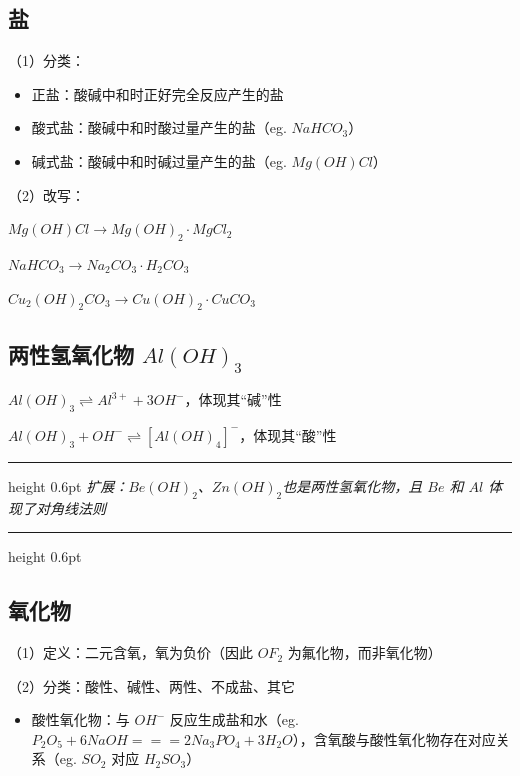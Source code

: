 \documentclass[UTF8,zihao=-4,openany]{ctexbook}
\newenvironment{notebox}
  {\par\smallskip\noindent\begingroup\begin{minipage}{\linewidth}\color{noteframe}\hrule height 0.6pt\smallskip\color{black}\itshape}
  {\par\smallskip\color{noteframe}\hrule height 0.6pt\end{minipage}\endgroup\par\smallskip}
\begin{document}
\subsection{盐}
（1）分类：\par
\begin{itemize}
\item 正盐：酸碱中和时正好完全反应产生的盐
\end{itemize}

\begin{itemize}
\item 酸式盐：酸碱中和时酸过量产生的盐（eg. $NaHCO_3$）
\item 碱式盐：酸碱中和时碱过量产生的盐（eg. $Mg(OH)Cl$）
\end{itemize}

（2）改写：\par

$Mg(OH)Cl \to Mg(OH)_2\cdot MgCl_2$\par

$NaHCO_3 \to Na_2CO_3\cdot H_2CO_3$\par

$Cu_2(OH)_2CO_3 \to Cu(OH)_2\cdot CuCO_3$\par
\subsection{两性氢氧化物 $Al(OH)_3$}
$Al(OH)_3\rightleftharpoons Al^{3+}+3OH^-$，体现其“碱”性\par

$Al(OH)_3+OH^-\rightleftharpoons [Al(OH)_4]^-$，体现其“酸”性\par
\begin{notebox}
扩展：$Be(OH)_2$、$Zn(OH)_2$也是两性氢氧化物，且 $Be$ 和 $Al$ 体现了对角线法则\par
\end{notebox}
\subsection{氧化物}
（1）定义：二元含氧，氧为负价（因此 $OF_2$ 为氟化物，而非氧化物）\par

（2）分类：酸性、碱性、两性、不成盐、其它\par

\begin{itemize}
\item 酸性氧化物：与 $OH^-$ 反应生成盐和水（eg. $P_2O_5+6NaOH =\!=\!=2Na_3PO_4+3H_2O $），含氧酸与酸性氧化物存在对应关系（eg. $SO_2$ 对应 $H_2SO_3$）
\end{itemize}
\end{document}
